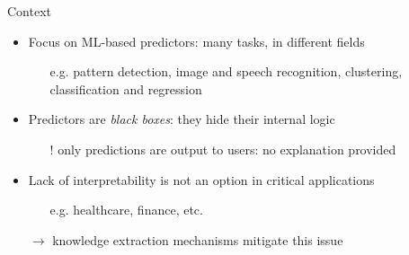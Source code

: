 \documentclass[presentation]{beamer}
\begin{document}
\begin{frame}[c]{Context}
    
    \vfill
    \begin{itemize}
        \item Focus on ML-based predictors:  many tasks, in different fields
        \begin{itemize}
            \item[e.g.] pattern detection, image and speech recognition, clustering, classification and regression
        \end{itemize}
        
        \vfill
        
        \item Predictors are \emph{black boxes}: they hide their internal logic 
        \begin{itemize}
            \item[!] only predictions are output to users: no \alert{explanation} provided
        \end{itemize}
        
        \vfill
        
        \item Lack of interpretability is not an option in critical applications
        \begin{itemize}
        	\item[e.g.] healthcare, finance, etc.
        \end{itemize}
    
    	\vfill
        
        \item[$\rightarrow$] knowledge extraction mechanisms mitigate this issue
        
    \end{itemize}
\end{frame}
\end{document}
